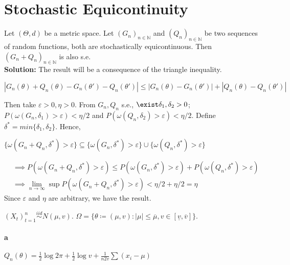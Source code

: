 \documentclass[11pt,letterpaper]{article}                  %
\begin{document}
\section*{Stochastic Equicontinuity}
\begin{problem}
Let $(\Theta, d)$ be a metric space. Let $(G_n)_{n \in \mathbb{N}}$ and $(Q_n)_{n \in \mathbb{N}}$ be two sequences of random functions, both are stochastically equicontinuous. Then $(G_n + Q_n)_{n \in \mathbb{N}}$ is also s.e.\\

\textbf{Solution:} The result will be a consequence of the triangle inequality.
\begin{center}
$|G_n(\theta)+Q_n(\theta)-G_n(\theta')-Q_n(\theta')|\leq |G_n(\theta)-G_n(\theta')|+|Q_n(\theta)-Q_n(\theta')|$
\end{center}
Then take $\varepsilon>0, \eta>0$. From $G_n, Q_n$ s.e., $\exist \delta_1,\delta_2>0$; $P(\omega(G_n,\delta_1)>\varepsilon)<\eta/2$ and $P(\omega(Q_n,\delta_2)>\varepsilon)<\eta/2$. Define $\delta^*=min\{\delta_1,\delta_2\}$. Hence,
\begin{center}
$\{\omega(G_n+Q_n,\delta^*)>\varepsilon\} \subseteq \{\omega(G_n,\delta^*)>\varepsilon\} \cup \{\omega(Q_n,\delta^*)>\varepsilon\}$
\end{center}
\begin{align*}
&\implies P(\omega(G_n+Q_n,\delta^*)>\varepsilon)\leq P(\omega(G_n,\delta^*)>\varepsilon) + P(\omega(Q_n,\delta^*)>\varepsilon)\\
&\implies \lim_{n\to\infty}\sup P(\omega(G_n+Q_n,\delta^*)>\varepsilon) < \eta/2+\eta/2=\eta
\end{align*}
Since $\varepsilon$ and $\eta$ are arbitrary, we have the result.
\end{problem}

\bigskip
\begin{problem}
\end{problem}

\bigskip
\begin{problem}
$(X_t)_{t=1}^{n} \overset{iid}{\sim} N(\mu, v) $. $\Omega = \{ \theta
\coloneqq (\mu,
v): |\mu| \le \overline{\mu}, v \in [\underline{v}, \overline{v}]\}$.
\paragraph*{a}
$Q_n(\theta) = \tfrac{1}{2}\log 2\pi + \tfrac{1}{2} \log v +
\tfrac{1}{n2v} \sum(x_i - \mu)$
\end{problem}
\end{document}
